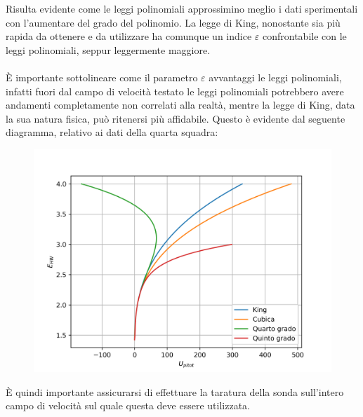 \noindent Risulta evidente come le leggi polinomiali approssimino meglio i dati sperimentali con l'aumentare del grado del polinomio. La legge di King, nonostante sia più rapida da ottenere e da utilizzare ha comunque un indice $\varepsilon$ confrontabile con le leggi polinomiali, seppur leggermente maggiore.\\\\
È importante sottolineare come il parametro $\varepsilon$ avvantaggi le leggi polinomiali, infatti fuori dal campo di velocità testato le leggi polinomiali potrebbero avere andamenti completamente non correlati alla realtà, mentre la legge di King, data la sua natura fisica, può ritenersi più affidabile. Questo è evidente dal seguente diagramma, relativo ai dati della quarta squadra:
\begin{figure}[H]
    \centering
    \includegraphics[width=.5\textwidth]{images/8/epswrong.png}
\end{figure}

\noindent È quindi importante assicurarsi di effettuare la taratura della sonda sull'intero campo di velocità sul quale questa deve essere utilizzata.